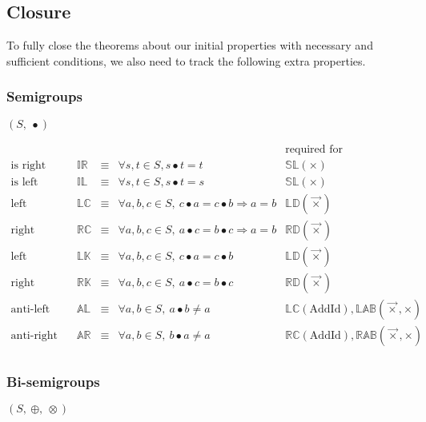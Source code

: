 \documentclass[10pt]{article}
\newcommand{\propname}[1]{{\mathbb{#1}}}
\begin{document}
\subsection{Closure} 

To fully close the theorems about our initial properties with necessary and sufficient conditions, we also need to track the following extra properties. 

\subsubsection{Semigroups}
$(S,\ \bullet)$

\[ 
\begin{array}{c|ccl|l} 
   & 
   & 
   & 
   & \mbox{required for} 
   \\ \hline 
\mbox{is right}   
   & \propname{IR} 
   & \equiv 
   & \forall s, t\in S, s \bullet t = t 
   & \propname{SL}(\times)
   \\ 
\mbox{is left}   
   & \propname{IL} 
   & \equiv 
   & \forall s, t\in S, s \bullet t = s 
   & \propname{SL}(\times)
   \\ 
\mbox{left cancellative}   
   & \propname{LC}
   & \equiv 
   & \forall a, b, c\in S,\  c \bullet a = c \bullet b \Rightarrow a = b 
   & \propname{LD}(\vec{\times})
   \\ 
\mbox{right cancellative}   
    & \propname{RC}
    & \equiv 
    & \forall a, b, c\in S,\  a \bullet c = b \bullet c \Rightarrow a = b
   & \propname{RD}(\vec{\times})
   \\ 
\mbox{left constant}   
   & \propname{LK}
   & \equiv 
   & \forall a, b, c\in S,\ c \bullet a = c \bullet b 
   & \propname{LD}(\vec{\times})
   \\ 
\mbox{right constant}   
   & \propname{RK}
   & \equiv 
   & \forall a, b, c\in S,\ a \bullet c =  b \bullet c
   & \propname{RD}(\vec{\times})
   \\ 
\mbox{anti-left}   
   & \propname{AL}
   & \equiv 
   & \forall a, b\in S,\ a \bullet b \not= a
   & \propname{LC}(\mathrm{AddId}),  
     \propname{LAB}(\vec{\times}, \times)   
   \\ 
\mbox{anti-right}   
   & \propname{AR}
   & \equiv 
   & \forall a, b\in S,\ b \bullet a \not= a
   & \propname{RC}(\mathrm{AddId}), 
     \propname{RAB}(\vec{\times}, \times)   
   \\ 
\end{array} 
\]


\subsubsection{Bi-semigroups}
$(S,\ \oplus,\ \otimes)$
\end{document}
